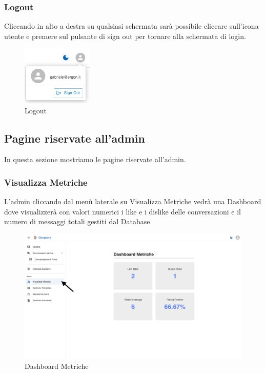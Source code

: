 \subsubsection{Logout}
Cliccando in alto a destra su qualsiasi schermata sarà possibile cliccare sull'icona utente e premere sul pulsante di sign out per tornare alla schermata di login.
\begin{figure}[h!]
    \centering
    \includegraphics[width=0.3\textwidth]{./img/logout.png}
    \caption{Logout}
\end{figure}

\subsection{Pagine riservate all'admin}
In questa sezione mostriamo le pagine riservate all'admin.

\subsubsection{Visualizza Metriche}
L'admin cliccando dal menù laterale su Visualizza Metriche vedrà una Dashboard dove visualizzerà con valori numerici i like e i dislike delle conversazioni e il numero di messaggi totali gestiti dal Database.
\begin{figure}[h!]
    \centering
    \includegraphics[width=\textwidth]{./img/visualizzaMetriche.png}
    \caption{Dashboard Metriche}
    \label{fig:Metriche}
\end{figure}

